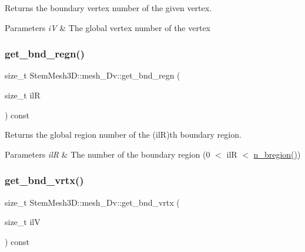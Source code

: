 Returns the boundary vertex number of the given vertex. 


\begin{DoxyParams}{Parameters}
{\em iV} & The global vertex number of the vertex \\
\hline
\end{DoxyParams}
\mbox{\label{classStemMesh3D_1_1mesh__3Dv_a91cb00af3bac18dbde6320e4178111ed}} 
\subsubsection{\texorpdfstring{get\+\_\+bnd\+\_\+regn()}{get\_bnd\_regn()}}
{\footnotesize\ttfamily size\+\_\+t Stem\+Mesh3\+D\+::mesh\+\_\+Dv\+::get\+\_\+bnd\+\_\+regn (\begin{DoxyParamCaption}\item[{size\+\_\+t}]{ilR }\end{DoxyParamCaption}) const}



Returns the global region number of the (ilR)\textquotesingle{}th boundary region. 


\begin{DoxyParams}{Parameters}
{\em ilR} & The number of the boundary region (0 $<$ ilR $<$ \hyperlink{classStemMesh3D_1_1mesh__3Dv_a7c885048a027fc84eb6d2b7e2590c5e2}{n\+\_\+bregion()}) \\
\hline
\end{DoxyParams}
\mbox{\label{classStemMesh3D_1_1mesh__3Dv_a397ec757e2e38525d7a9721112f6a08a}} 
\subsubsection{\texorpdfstring{get\+\_\+bnd\+\_\+vrtx()}{get\_bnd\_vrtx()}}
{\footnotesize\ttfamily size\+\_\+t Stem\+Mesh3\+D\+::mesh\+\_\+Dv\+::get\+\_\+bnd\+\_\+vrtx (\begin{DoxyParamCaption}\item[{size\+\_\+t}]{ilV }\end{DoxyParamCaption}) const}



